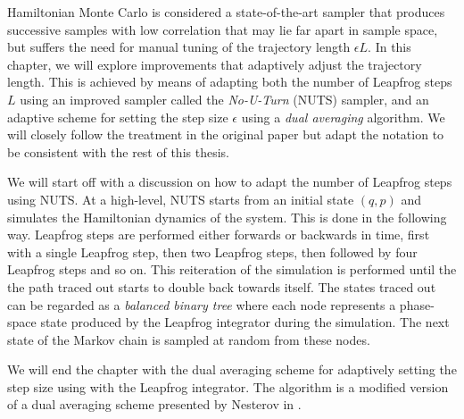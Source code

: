 Hamiltonian Monte Carlo is considered a state-of-the-art sampler that produces successive samples with low correlation
that may lie far apart in sample space, 
but suffers the need for manual tuning of the trajectory length $\epsilon L$. 
In this chapter, we will explore improvements that adaptively adjust the trajectory length. This is achieved by means of adapting both the number of Leapfrog steps $L$ using an improved sampler called the \textit{No-U-Turn} (NUTS) sampler, and an adaptive scheme for setting the step size $\epsilon$ using a \textit{dual averaging} algorithm. We will closely follow the treatment in the original paper \cite{nuts} but adapt the notation to be consistent with the rest of this thesis.

We will start off with a discussion on how to adapt the number of Leapfrog steps using NUTS. At a high-level, NUTS starts from an initial state $(q, p)$ and simulates the Hamiltonian dynamics of the system. This is
done in the following way. Leapfrog steps are performed either forwards or backwards in time, first with a single Leapfrog step, then two Leapfrog steps, then followed by four Leapfrog steps and so on. This reiteration of the simulation is performed until the the path traced out starts to double back towards itself. The states traced out can be regarded as a \textit{balanced binary tree} where
each node represents a phase-space state produced by the Leapfrog integrator during the simulation. The next state of the Markov chain is sampled at random from these nodes.  

We will end the chapter with the dual averaging scheme for adaptively setting the step size using with the Leapfrog integrator. The algorithm is a modified version of a dual averaging scheme presented by Nesterov in \cite{Nesterov2009}.



